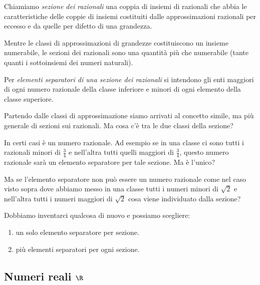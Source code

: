 Chiamiamo \emph{sezione dei razionali} una coppia di insiemi 
di razionali che abbia le caratteristiche delle coppie di insiemi costituiti 
dalle approssimazioni razionali per eccesso e da quelle per difetto di una 
grandezza.

Mentre le classi di approssimazioni di grandezze costituiscono un insieme 
numerabile, le sezioni dei razionali sono una quantità più che numerabile 
(tante quanti i sottoinsiemi dei numeri naturali). 

Per \emph{elementi separatori di una sezione dei razionali} 
si intendono gli enti maggiori di ogni numero razionale della classe 
inferiore e minori di ogni elemento della classe superiore.

Partendo dalle classi di approssimazione siamo arrivati al concetto simile, 
ma più generale di sezioni sui razionali. Ma cosa c'è tra le due classi della 
sezione? 

In certi casi è un numero razionale. Ad esempio se in una classe ci sono 
tutti i razionali minori di \(\frac{3}{4}\) e nell'altra tutti quelli 
maggiori di \(\frac{3}{4}\), questo numero razionale sarà un elemento 
separatore per tale sezione. Ma è l'unico?

Ma se l'elemento separatore non può essere un numero razionale come nel caso 
visto sopra dove abbiamo messo in una classe tutti i numeri minori di 
\(\sqrt{2}\) e nell'altra tutti i numeri maggiori di \(\sqrt{2}\) cosa viene 
individuato dalla sezione?

Dobbiamo inventarci qualcosa di nuovo e possiamo scegliere:
\begin{enumerate} [noitemsep]
\item un solo elemento separatore per sezione.
\item più elementi separatori per ogni sezione.
\end{enumerate}

\subsection{Numeri reali \(\R\)}



